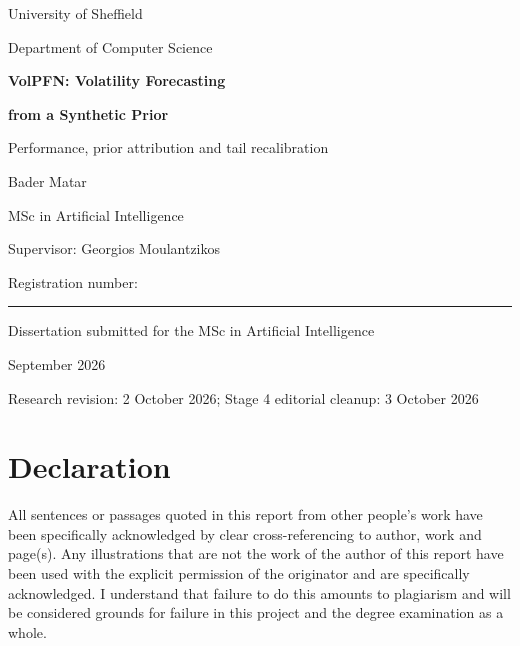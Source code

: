 \hypersetup{pageanchor=false}
\begin{titlepage}
\centering
{\large University of Sheffield\par}
\vspace{0.25cm}
{\normalsize Department of Computer Science\par}
\vspace{3cm}
{\LARGE\bfseries VolPFN: Volatility Forecasting\par}
\vspace{0.35cm}
{\LARGE\bfseries from a Synthetic Prior\par}
\vspace{1cm}
{\large Performance, prior attribution and tail recalibration\par}
\vspace{2.8cm}
{\Large Bader Matar\par}
\vspace{0.7cm}
{\normalsize MSc in Artificial Intelligence\par}
\vspace{1.1cm}
{\normalsize Supervisor: Georgios Moulantzikos\par}
\vspace{0.7cm}
{\normalsize Registration number: \rule{3cm}{0.4pt}\par}
\vfill
{\normalsize Dissertation submitted for the MSc in Artificial Intelligence\par}
\vspace{0.3cm}
{\normalsize September 2026\par}
\vspace{0.3cm}
{\footnotesize Research revision: 2 October 2026; Stage 4 editorial cleanup: 3 October 2026\par}
\end{titlepage}
\hypersetup{pageanchor=true}

\chapter*{Declaration}
All sentences or passages quoted in this report from other people's work have been specifically acknowledged by clear cross-referencing to author, work and page(s). Any illustrations that are not the work of the author of this report have been used with the explicit permission of the originator and are specifically acknowledged. I understand that failure to do this amounts to plagiarism and will be considered grounds for failure in this project and the degree examination as a whole.

